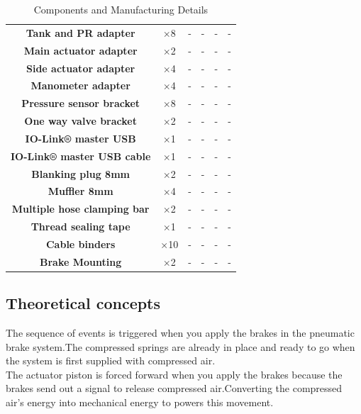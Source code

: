 \begin{table}[htbp]
\begin{adjustbox}{width=\textwidth}
\begin{tabular}{|c|c|c|c|c|c|}
\textbf{Tank and PR adapter} & $\times$8 & - & - & - & - \\
\textbf{Main actuator adapter} & $\times$2 & - & - & - & - \\
\textbf{Side actuator adapter} &$\times$4 & - & - & - & - \\
\textbf{Manometer adapter} & $\times$4 & - & - & - & - \\
\textbf{Pressure sensor bracket} & $\times$8 & - & - & - & - \\
\textbf{One way valve bracket} & $\times$2 & - & - & - & - \\
\textbf{IO-Link® master USB} &$\times$1 & - & - & - & - \\
\textbf{IO-Link® master USB cable} & $\times$1 & - & - & - & - \\
\textbf{Blanking plug 8mm} & $\times$2 & - & - & - & - \\
\textbf{Muffler 8mm} & $\times$4 & - & - & - & - \\
\textbf{Multiple hose clamping bar} & $\times$2 & - & - & - & - \\
\textbf{Thread sealing tape} & $\times$1 & - & - & - & - \\
\textbf{Cable binders} & $\times$10 & - & - & - & - \\
\textbf{Brake Mounting} & $\times$2 & - & - & - & - \\
\hline %
\end{tabular}
\end{adjustbox}
\caption{Components and Manufacturing Details}
\label{table:components}
\end{table}








\newpage
\subsection{Theoretical concepts}
\label{subsec:theoretical-concept}
The sequence of events is triggered when you apply the brakes in the pneumatic brake system.The compressed springs are already in place and ready to go when the system is first supplied with compressed air.\\

The actuator piston is forced forward when you apply the brakes because the brakes send out a signal to release compressed air.Converting the compressed air's energy into mechanical energy to powers this movement.\\

